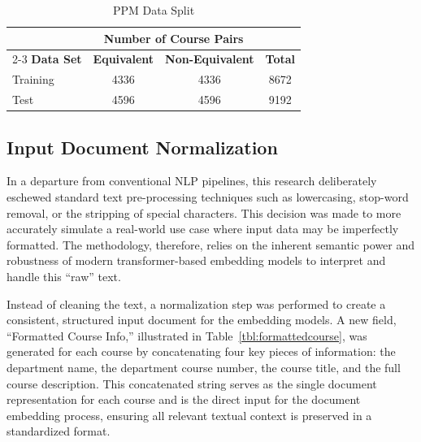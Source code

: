 \begin{table}[tb]
    \captionsetup{skip=5pt}
    \centering
    \caption{PPM Data Split}
    \begin{tabular}{lccc}
        \toprule
        & \multicolumn{2}{c}{\textbf{Number of Course Pairs}} & \\
        \cmidrule(lr){2-3}\vspace{1mm}
        \textbf{Data Set} & \textbf{Equivalent} & \textbf{Non-Equivalent} & \textbf{Total} \\
        \midrule
        Training     & 4336  & 4336    &  8672                                       \\
        Test         & 4596  & 4596    &  9192                                   \\
        \bottomrule
    \end{tabular}
    \label{tbl:ppmdatasplit}
\end{table}

\subsection{Input Document Normalization}\label{ch:3.2.2}
In a departure from conventional NLP pipelines, this research deliberately eschewed standard text pre-processing techniques such as lowercasing, stop-word removal, or the stripping of special characters. This decision was made to more accurately simulate a real-world use case where input data may be imperfectly formatted. The methodology, therefore, relies on the inherent semantic power and robustness of modern transformer-based embedding models to interpret and handle this ``raw'' text.

Instead of cleaning the text, a normalization step was performed to create a consistent, structured input document for the embedding models. A new field, ``Formatted Course Info,'' illustrated in Table~\ref{tbl:formattedcourse}, was generated for each course by concatenating four key pieces of information: the department name, the department course number, the course title, and the full course description. This concatenated string serves as the single document representation for each course and is the direct input for the document embedding process, ensuring all relevant textual context is preserved in a standardized format.

